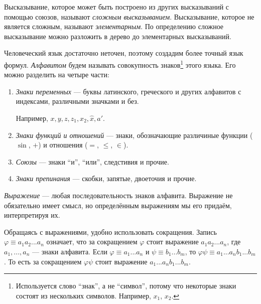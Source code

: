\vspace{-0.25em}
Высказывание, которое может быть построено из других высказываний с помощью
союзов, называют {\it сложным высказыванием}.
Высказывание, которое не является сложным, называют {\it элементарным}.
По определению сложное высказывание можно разложить в дерево до
элементарных высказываний.

Человеческий язык достаточно неточен, поэтому создадим более точный язык формул.
{\it Алфавитом} будем называть совокупность знаков\footnote{
  Используется слово ``знак'', а не ``символ'', потому что некоторые знаки
  состоят из нескольких символов. Например, $x_1$, $x_2$.} этого языка.
Его можно разделить на четыре части:
\begin{enumerate}
  \item{}{\it Знаки переменных} --- буквы латинского,
  греческого и других алфавитов с индексами, различными значками и без.

  Например, $x,y,z,z_1,x_2,\hat x,a'$.

  \item{}{\it Знаки функций и отношений}
  --- знаки, обозначающие
  различиные функции ($\sin$, $+$) и отношения ($=$, $\leq$, $\in$).

  \item{}{\it Союзы}
  --- знаки ``и'', ``или'', следстивия и прочие.

  \item{}{\it Знаки препинания} --- скобки,
  запятые, двоеточия и прочие.
\end{enumerate}

{\it Выражение} --- любая последовательность знаков алфавита.
Выражение не обязательно имеет смысл, но определённым выражениям мы его придаём,
интерпретируя их.

Обращаясь с выражениями, удобно использовать сокращения. Запись
$\varphi\equiv a_1a_2...a_{n}$ означает, что за сокращением $\varphi$
стоит выражение $a_1a_2...a_{n}$, где $a_1,...,a_{n}$ --- знаки алфавита.
Если ${\varphi\equiv a_1...a_{n}}$ и ${\psi\equiv b_1...b_{m}}$,
то $\varphi\psi\equiv a_1...a_{n}b_1...b_{m}$. То есть
за сокращением $\varphi\psi$ стоит выражение $a_1...a_{n}b_1...b_{m}$.

